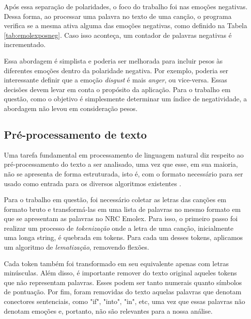Após essa separação de polaridades, o foco do trabalho foi nas emoções
negativas. Dessa forma, ao processar uma palavra no texto de uma canção,
o programa verifica se a mesma ativa alguma das emoções negativas,
como definido na Tabela \ref{tab:emolexposneg}. Caso isso aconteça,
um contador de palavras negativas é incrementado.

Essa abordagem é simplista e poderia ser melhorada para incluir pesos
às diferentes emoções dentro da polaridade negativa. Por exemplo, poderia
ser interessante definir que a emoção \textit{disgust} é mais
\textit{anger}, ou vice-versa. Essas decisões devem levar em conta o propósito da aplicação. Para o trabalho em questão, como o objetivo é
simplesmente determinar um índice de negatividade, a abordagem não
levou em consideração pesos.

\subsection{Pré-processamento de texto} \label{subsec:pre}

Uma tarefa fundamental em processamento de linguagem natural diz respeito 
ao pré-processamento do texto a ser analisado, uma vez que esse, em sua 
maioria, não se apresenta de forma estruturada, isto é, com o formato
necessário para ser usado como entrada para os diversos algoritmos existentes
\cite{Manning:1999:FSN:311445}.

Para o trabalho em questão, foi necessário coletar as letras das canções em 
formato bruto e transformá-las em uma lista de palavras no mesmo formato em
que se apresentam as palavras no NRC Emolex. Para isso, o primeiro passo
foi realizar um processo de \textit{tokenização} onde a letra de uma canção,
inicialmente uma longa string, é quebrada em tokens. Para cada um desses
tokens, aplicamos um algoritmo de \textit{lematização}, removendo flexões.

Cada token também foi transformado em seu equivalente apenas com letras
minúsculas. Além disso, é importante remover do texto original aqueles tokens que não representam palavras. Esses podem ser tanto numerais quanto símbolos de pontuação. Por fim, foram removidas do texto aquelas palavras que denotam
conectores sentenciais, como "if", "into", "in", etc, uma vez que essas
palavras não denotam emoções e, portanto, não são relevantes para a nossa
análise.


